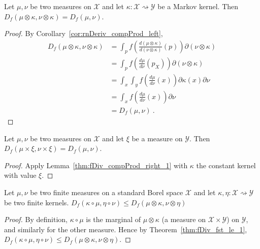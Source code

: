 \begin{lemma}
  \label{thm:fDiv_compProd_right_1}
  \leanok
  Let $\mu, \nu$ be two measures on $\mathcal X$ and let $\kappa : \mathcal X \rightsquigarrow \mathcal Y$ be a Markov kernel.
  Then $D_f(\mu \otimes \kappa, \nu \otimes \kappa) = D_f(\mu, \nu)$.
\end{lemma}

\begin{proof}\leanok
{}
By Corollary~\ref{cor:rnDeriv_compProd_left},
\begin{align*}
D_f(\mu \otimes \kappa, \nu \otimes \kappa)
&= \int_{p} f\left(\frac{d (\mu \otimes \kappa)}{d (\nu \otimes \kappa)}(p)\right) \partial(\nu \otimes \kappa)
\\
&= \int_{p} f\left(\frac{d \mu}{d \nu}(p_X)\right) \partial(\nu \otimes \kappa)
\\
&= \int_x \int_y f\left(\frac{d \mu}{d \nu}(x)\right) \partial \kappa(x) \partial \nu
\\
&= \int_x f\left(\frac{d \mu}{d \nu}(x)\right) \partial \nu
\\
&= D_f(\mu, \nu)
\: .
\end{align*}
\end{proof}

\begin{corollary}
  \label{cor:fDiv_prod_right_1}
  Let $\mu, \nu$ be two measures on $\mathcal X$ and let $\xi$ be a measure on $\mathcal Y$.
  Then $D_f(\mu \times \xi, \nu \times \xi) = D_f(\mu, \nu)$.
\end{corollary}

\begin{proof}
Apply Lemma~\ref{thm:fDiv_compProd_right_1} with $\kappa$ the constant kernel with value $\xi$.
\end{proof}

\begin{lemma}
  \label{lem:fDiv_comp_le_compProd_1}
  \leanok
  Let $\mu, \nu$ be two finite measures on a standard Borel space $\mathcal X$ and let $\kappa, \eta : \mathcal X \rightsquigarrow \mathcal Y$ be two finite kernels.
  $D_f(\kappa \circ \mu, \eta \circ \nu) \le D_f(\mu \otimes \kappa, \nu \otimes \eta)$
\end{lemma}

\begin{proof}\leanok
{}
By definition, $\kappa \circ \mu$ is the marginal of $\mu \otimes \kappa$ (a measure on $\mathcal X \times \mathcal Y$) on $\mathcal Y$, and similarly for the other measure. Hence by Theorem~\ref{thm:fDiv_fst_le_1}, $D_f(\kappa \circ \mu, \eta \circ \nu) \le D_f(\mu \otimes \kappa, \nu \otimes \eta)$. 
\end{proof}

